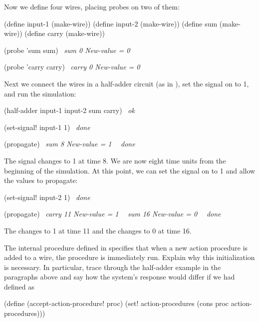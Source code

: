 \noindent
Now we define four wires, placing probes on two of them:

\begin{codeBlock}
(define input-1 (make-wire))
(define input-2 (make-wire))
(define sum (make-wire))
(define carry (make-wire))

(probe 'sum sum)
~\textit{sum 0  New-value = 0}~

(probe 'carry carry)
~\textit{carry 0  New-value = 0}~
\end{codeBlock}

\noindent
Next we connect the wires in a half-adder circuit (as in ),
set the signal on  to 1, and run the simulation:

\begin{codeBlock}
(half-adder input-1 input-2 sum carry)
~\textit{ok}~
\end{codeBlock}

\begin{codeBlock}
(set-signal! input-1 1)
~\textit{done}~
\end{codeBlock}

\begin{codeBlock}
(propagate)
~\textit{sum 8  New-value = 1}~
~\textit{done}~
\end{codeBlock}

\noindent
The  signal changes to 1 at time 8.  We are now eight time units from
the beginning of the simulation.  At this point, we can set the signal on
 to 1 and allow the values to propagate:

\begin{codeBlock}
(set-signal! input-2 1)
~\textit{done}~
\end{codeBlock}

\begin{codeBlock}
(propagate)
~\textit{carry 11  New-value = 1}~
~\textit{sum 16  New-value = 0}~
~\textit{done}~
\end{codeBlock}

\noindent
The  changes to 1 at time 11 and the  changes to 0 at
time 16.

\begin{exerciseGroup}
\label{Exercise 3.31}
 The internal procedure
 defined in  specifies that when
a new action procedure is added to a wire, the procedure is immediately run.
Explain why this initialization is necessary.  In particular, trace through the
half-adder example in the paragraphs above and say how the system's response
would differ if we had defined  as

\begin{codeBlock}
(define (accept-action-procedure! proc)
  (set! action-procedures
        (cons proc action-procedures)))
\end{codeBlock}
\end{exerciseGroup}

